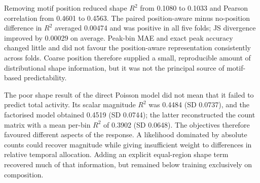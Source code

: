 \documentclass[a4paper,12pt]{article}
\begin{document}
\begin{table}[htbp]
\centering
\caption{Five-fold prediction of temporal shape from the dense motif matrix on the $p<0.001$ subset. Values are fold means; parentheses contain sample SDs. Lower values are preferable for JS, Wasserstein and peak MAE.}
\label{tab:shapeobjectives}
\end{table}

Removing motif position reduced shape $R^2$ from 0.1080 to 0.1033 and Pearson correlation from 0.4601 to 0.4563. The paired position-aware minus no-position difference in $R^2$ averaged 0.00474 and was positive in all five folds; JS divergence improved by 0.00029 on average. Peak-bin MAE and exact peak accuracy changed little and did not favour the position-aware representation consistently across folds. Coarse position therefore supplied a small, reproducible amount of distributional shape information, but it was not the principal source of motif-based predictability.

The poor shape result of the direct Poisson model did not mean that it failed to predict total activity. Its scalar magnitude $R^2$ was 0.4484 (SD 0.0737), and the factorised model obtained 0.4519 (SD 0.0744); the latter reconstructed the count matrix with a mean per-bin $R^2$ of 0.3902 (SD 0.0648). The objectives therefore favoured different aspects of the response. A likelihood dominated by absolute counts could recover magnitude while giving insufficient weight to differences in relative temporal allocation. Adding an explicit equal-region shape term recovered much of that information, but remained below training exclusively on composition.
\end{document}
